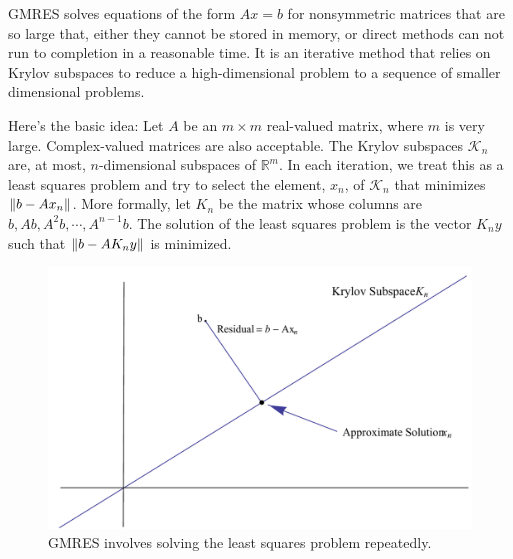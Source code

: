 \label{lab:GMRES}

GMRES solves equations of the form $Ax=b$ for nonsymmetric matrices that are so large that, either they cannot be stored in memory, or direct methods can not run to completion in a reasonable time.
It is an iterative method that relies on Krylov subspaces to reduce a high-dimensional problem to a sequence of smaller dimensional problems.

Here's the basic idea: Let $A$ be an $m\times m$ real-valued matrix, where $m$ is very large.
Complex-valued matrices are also acceptable.
The Krylov subspaces $\mathcal{K}_n$ are, at most, $n$-dimensional subspaces of $\mathbb{R}^m$.
In each iteration, we treat this as a least squares problem and try to select the element, $x_n$, of $\mathcal{K}_n$ that minimizes $\left\lVert b - A x_n\right\rVert$.
More formally, let $K_n$ be the matrix whose columns are $b, Ab, A^{2}b, \cdots, A^{n-1}b$.
The solution of the least squares problem is the vector $K_{n}y$ such that $\left\lVert b-A K_{n}y\right\rVert$ is minimized.
\begin{figure}
\includegraphics[width=\textwidth]{LeastSquares}
\caption{GMRES involves solving the least squares problem repeatedly.}
\end{figure}

